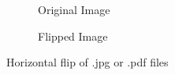 \documentclass{article}
\begin{document}
\begin{figure}
   \begin{subfigure}[b]{.5\textwidth}
      \caption{Original Image}
    \end{subfigure}
    \begin{subfigure}[b]{.5\textwidth}
    \caption{Flipped Image}
  \end{subfigure}
\caption{Horizontal flip of .jpg or .pdf files}
\end{figure}
\end{document}
